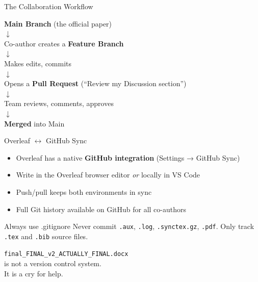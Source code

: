\documentclass[aspectratio=169]{beamer}
\begin{document}
\begin{frame}{The Collaboration Workflow}
  \begin{center}
    \textbf{Main Branch} (the official paper)\\
    $\downarrow$\\
    Co-author creates a \textbf{Feature Branch}\\
    $\downarrow$\\
    Makes edits, commits\\
    $\downarrow$\\
    Opens a \textbf{Pull Request} (``Review my Discussion section'')\\
    $\downarrow$\\
    Team reviews, comments, approves\\
    $\downarrow$\\
    \textbf{Merged} into Main
  \end{center}
\end{frame}

\begin{frame}{Overleaf $\leftrightarrow$ GitHub Sync}
  \begin{itemize}
    \item Overleaf has a native \textbf{GitHub integration} (Settings → GitHub Sync)
    \item Write in the Overleaf browser editor \textit{or} locally in VS Code
    \item Push/pull keeps both environments in sync
    \item Full Git history available on GitHub for all co-authors
  \end{itemize}
  \vspace{0.3cm}
  \begin{alertblock}{Always use .gitignore}
    Never commit \texttt{.aux}, \texttt{.log}, \texttt{.synctex.gz}, \texttt{.pdf}. Only track \texttt{.tex} and \texttt{.bib} source files.
  \end{alertblock}
\end{frame}

\begin{frame}[standout]
  \texttt{final\_FINAL\_v2\_ACTUALLY\_FINAL.docx}\\
  is not a version control system.\\
  It is a cry for help.
\end{frame}
\end{document}
